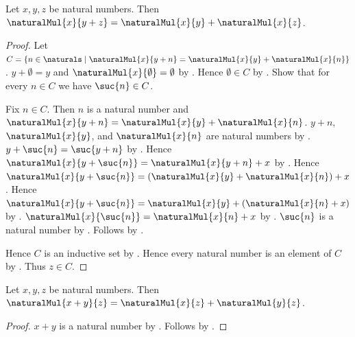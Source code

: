 \begin{theorem}\label{natural_multiplication_distributive_left}
    Let $x,y,z$ be natural numbers.
    Then $\naturalMul{x}{y+z}
        =\naturalMul{x}{y}+\naturalMul{x}{z}$.
\end{theorem}
\begin{proof}
    Let $C=\{n\in\naturals\mid
        \text{$\naturalMul{x}{y+n}
            =\naturalMul{x}{y}+\naturalMul{x}{n}$}\}$.
    $y+\emptyset=y$ and
        $\naturalMul{x}{\emptyset}=\emptyset$
        by .
    Hence $\emptyset\in C$
        by .
    Show that for every $n\in C$ we have $\suc{n}\in C$.
    \begin{subproof}
        Fix $n\in C$.
        Then $n$ is a natural number and
            $\naturalMul{x}{y+n}
                =\naturalMul{x}{y}+\naturalMul{x}{n}$.
        $y+n$, $\naturalMul{x}{y}$, and $\naturalMul{x}{n}$
            are natural numbers
            by .
        $y+\suc{n}=\suc{y+n}$
            by .
        Hence $\naturalMul{x}{y+\suc{n}}
            =\naturalMul{x}{y+n}+x$
            by .
        Hence $\naturalMul{x}{y+\suc{n}}
            =(\naturalMul{x}{y}+\naturalMul{x}{n})+x$.
        Hence $\naturalMul{x}{y+\suc{n}}
            =\naturalMul{x}{y}+(\naturalMul{x}{n}+x)$
            by .
        $\naturalMul{x}{\suc{n}}=\naturalMul{x}{n}+x$
            by .
        $\suc{n}$ is a natural number by .
        Follows by
            .
    \end{subproof}
    Hence $C$ is an inductive set by .
    Hence every natural number is an element of $C$
        by .
    Thus $z\in C$.
\end{proof}

\begin{corollary}\label{natural_multiplication_distributive_right}
    Let $x,y,z$ be natural numbers.
    Then $\naturalMul{x+y}{z}
        =\naturalMul{x}{z}+\naturalMul{y}{z}$.
\end{corollary}
\begin{proof}
    $x+y$ is a natural number by .
    Follows by
        .
\end{proof}

